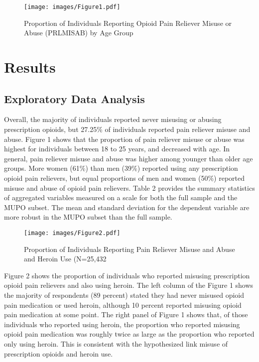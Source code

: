 \documentclass[sigconf]{acmart}
\begin{document}
\begin{figure}[!ht]
  \centering\texttt{[image: images/Figure1.pdf]}
  \caption{Proportion of Individuals Reporting Opioid Pain Reliever Misuse 
  or Abuse (PRLMISAB) by Age Group}
  \label{f:Figure1}
\end{figure}

\section{Results}

\subsection{Exploratory Data Analysis}

Overall, the majority of individuals reported never misusing or abusing 
prescription opioids, but 27.25\% of individuals reported pain reliever misuse
and abuse. Figure 1 shows that the proportion of pain reliever misuse 
or abuse was highest for individuals between 18 to 25 years, and decreased
with age. In general, pain reliever misuse and abuse was higher among younger 
than older age groups. More women (61\%) than men (39\%) reported using any
prescription opioid pain relievers, but equal proportions of men and women 
(50\%) reported misuse and abuse of opioid pain relievers. Table 2 provides 
the summary statistics of aggregated variables measured on a scale for both 
the full sample and the MUPO subset. The mean and standard deviation for the 
dependent variable are more robust in the MUPO subset than the full sample.  

\begin{figure}[!ht]
  \centering\texttt{[image: images/Figure2.pdf]}
  \caption{Proportion of Individuals Reporting Pain Reliever Misuse
  and Abuse and Heroin Use (N=25,432}
  \label{f:Figure2}
\end{figure}


Figure 2 shows the proportion of individuals who reported misusing prescription 
opioid pain relievers and also using heroin. The left column of the Figure 1 
shows the majority of respondents (89 percent) stated they had never misused 
opioid pain medication or used heroin, although 10 percent reported misusing 
opioid pain medication at some point. The right panel of Figure 1 shows that, 
of those individuals who reported using heroin, the proportion who reported 
misusing opioid pain medication was roughly twice as large as the proportion 
who reported only using heroin. This is consistent with the hypothesized 
link misuse of prescription opioids and heroin use. 
\end{document}
